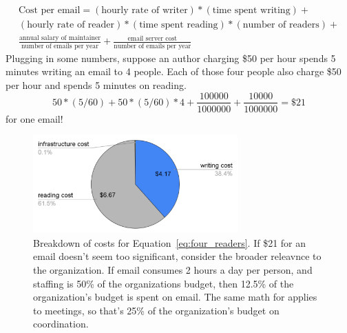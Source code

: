 \begin{multline}
\text{Cost per email} = 
(\text{hourly rate of writer})*(\text{time spent writing}) +\\
(\text{hourly rate of reader})*(\text{time spent reading})*(\text{number of readers})+\\
\frac{\text{annual salary of maintainer}}{\text{number of emails per year}} + \frac{\text{email server cost}}{\text{number of emails per year}}
\end{multline}
Plugging in some numbers, suppose an author charging \$50 per hour spends 5 minutes writing an email to 4 people. Each of those four people also charge \$50 per hour and spends 5 minutes on reading. 
\begin{equation}
50*(5/60) + 50*(5/60)*4 + \frac{100000}{1000000} + \frac{10000}{1000000} = \$21
\label{eq:four_readers}
\end{equation}
for one email!

\begin{figure}
    \centering
    \includegraphics[width=0.7\textwidth]{images/email_costs_5minutes_4people.pdf}
    \caption{Breakdown of costs for Equation~\ref{eq:four_readers}. If \$21 for an email doesn't seem too significant, consider the broader releavnce to the organization. If email consumes 2 hours a day per person, and staffing is 50\% of the organizations budget, then 
    12.5\% of the organization's budget is spent on email. The same math for applies to meetings, so that's 25\% of the organization's budget on coordination.}
    \label{fig:my_label}
\end{figure}



